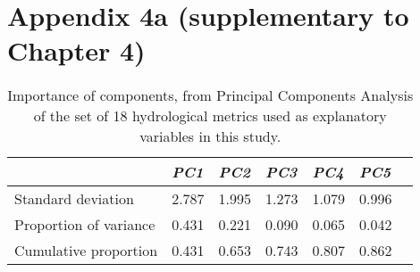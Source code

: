 \chapter[Appendix 4a (supplementary to Chapter 4)]{Appendix 4a (supplementary to Chapter 4)}

\begin{table}[ht]
\tiny
\centering
\caption[PCA of hydrological variables]{Importance of components, from Principal Components Analysis of the set of 18 hydrological metrics used as explanatory variables in this study.}
\label{Ch4sup_T1}
\begin{tabu} to 
\hline
                       &  \textit{PC1}   & \textit{PC2}   & \textit{PC3}   & \textit{PC4}   & \textit{PC5}  \\ \hline
Standard deviation     & 2.787 & 1.995 & 1.273 & 1.079 & 0.996 \\
Proportion of variance & 0.431 & 0.221 & 0.090 & 0.065 & 0.042 \\
Cumulative proportion  & 0.431 & 0.653 & 0.743 & 0.807 & 0.862 \\ \hline
\end{tabu}
\end{table}

